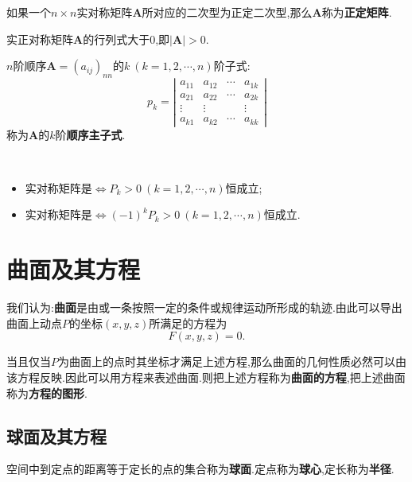 \documentclass[9pt,a4paper]{book}
\begin{document}
\begin{defination}
	如果一个$ n\times n $实对称矩阵$ \bm{A} $所对应的二次型为正定二次型,那么$ \bm{A} $称为\textbf{正定矩阵}.
\end{defination}
\begin{feature}
	实正对称矩阵$ \bm{A} $的行列式大于$ 0 $,即$ |\bm{A}|>0 $.
\end{feature}
\begin{defination}[$ \bm{A} $的$ k $阶顺序主子式的定义]
	$ n $阶顺序$ \bm{A}=(a_{ij})_{nn} $的$ k\ (k=1,2,\cdots,n) $阶子式:
	\[{p_k} = \left| {\begin{array}{cccc}
		{{a_{11}}}&{{a_{12}}}& \cdots &{{a_{1k}}}\\
		{{a_{21}}}&{{a_{22}}}& \cdots &{{a_{2k}}}\\
		\vdots & \vdots &{}& \vdots \\
		{{a_{k1}}}&{{a_{k2}}}& \cdots &{{a_{kk}}}
		\end{array}} \right|\]
	称为$ \bm{A} $的$ k $阶\textbf{顺序主子式}.
\end{defination}
\begin{theorem}[实对称矩阵与正定矩阵的关系]
	\,\\
	\begin{itemize}
		\item 实对称矩阵是$ \Leftrightarrow P_k>0 \ (k=1,2,\cdots,n) $恒成立;
		\item 实对称矩阵是$ \Leftrightarrow (-1)^kP_k>0 \ (k=1,2,\cdots,n) $恒成立.
	\end{itemize}
\end{theorem}

\section{曲面及其方程}
我们认为:\textbf{曲面}是由或一条按照一定的条件或规律运动所形成的轨迹.由此可以导出曲面上动点$ P $的坐标$ (x,y,z) $所满足的方程为
\[
F(x,y,z)=0.
\]

当且仅当$ P $为曲面上的点时其坐标才满足上述方程,那么曲面的几何性质必然可以由该方程反映.因此可以用方程来表述曲面.则把上述方程称为\textbf{曲面的方程},把上述曲面称为\textbf{方程的图形}.
\subsection{球面及其方程}
\begin{defination}[球面定义]
	空间中到定点的距离等于定长的点的集合称为\textbf{球面}.定点称为\textbf{球心},定长称为\textbf{半径}.
\end{defination}






\newpage
{}
\appendix
\kaishu
\printindex
\end{document}
